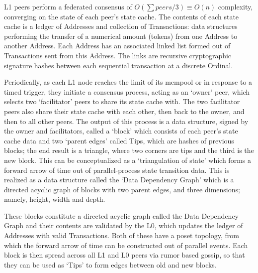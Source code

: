 \documentclass{article}
\begin{document}
L1 peers perform a federated consensus of $O(\sum peers/3) \equiv O(n)$ complexity, converging on the state of each peer’s state cache. The contents of each state cache is a ledger of Addresses and collection of Transactions: data structures performing the transfer of a numerical amount (tokens) from one Address to another Address. Each Address has an associated linked list formed out of Transactions sent from this Address. The links are recursive cryptographic signature hashes between each sequential transaction at a discrete Ordinal.

Periodically, as each L1 node reaches the limit of its mempool or in response to a timed trigger, they initiate a consensus process, acting as an ‘owner’ peer, which selects two ‘facilitator’ peers to share its state cache with. The two facilitator peers also share their state cache with each other, then back to the owner, and then to all other peers. The output of this process is a data structure, signed by the owner and facilitators, called a ‘block’ which consists of each peer’s state cache data and two ‘parent edges’ called Tips, which are hashes of previous blocks; the end result is a triangle, where two corners are tips and the third is the new block. This can be conceptualized as a ‘triangulation of state’ which forms a forward arrow of time out of parallel-process state transition data. This is realized as a data structure called the ‘Data Dependency Graph’ which is a directed acyclic graph of blocks with two parent edges, and three dimensions; namely, height, width and depth. 

These blocks constitute a directed acyclic graph called the Data Dependency Graph and their contents are validated by the L0, which updates the ledger of Addresses with valid Transactions. Both of these have a poset topology, from which the forward arrow of time can be constructed out of parallel events. Each block is then spread across all L1 and L0 peers via rumor based gossip, so that they can be used as ‘Tips’ to form edges between old and new blocks.
\end{document}
